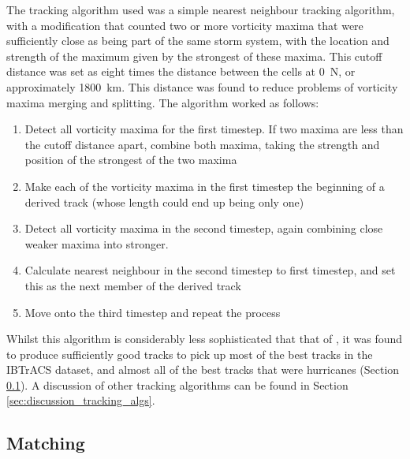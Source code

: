 \documentclass[pdftex,12pt,a4paper]{report}
\begin{document}
The tracking algorithm used was a simple nearest neighbour tracking algorithm, with a modification
that counted two or more vorticity maxima that were sufficiently close as being part of the same storm
system, with the location and strength of the maximum given by the strongest of
these maxima. This cutoff distance was set as eight times the distance between the cells at
0\textdegree\ N, or approximately \SI{1800}{km}. This distance was found to reduce problems of
vorticity maxima merging and splitting. The algorithm worked as follows:

\begin{enumerate}
    \item Detect all vorticity maxima for the first timestep. If two maxima are less than the cutoff
        distance apart, combine both maxima, taking the strength and position of the strongest of
        the two maxima
    \item Make each of the vorticity maxima in the first timestep the beginning of a derived track
        (whose length could end up being only one)
    \item Detect all vorticity maxima in the second timestep, again combining close weaker maxima
        into stronger. 
    \item Calculate nearest neighbour in the second timestep to first timestep, and set this as the
        next member of the derived track
    \item Move onto the third timestep and repeat the process
\end{enumerate}

Whilst this algorithm is considerably less sophisticated that that of \textcite{hodges1994general},
it was found to produce sufficiently good tracks to pick up most of the best tracks in the IBTrACS
dataset, and almost all of the best tracks that were hurricanes (Section
\ref{sec:tracking_results}). A discussion of other tracking algorithms can be found in Section
\ref{sec:discussion_tracking_algs}.

\subsection{Matching}
\label{sec:tracking_results}
\end{document}
